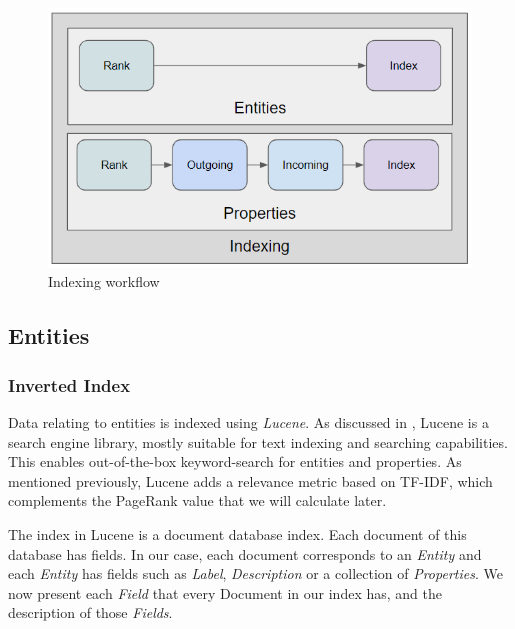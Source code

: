 \begin{figure}[H]
    \centering
        \includegraphics[width=0.7\linewidth]{imagenes/Indexing.png}
        \caption{Indexing workflow}
        \label{fig:indexing}
\end{figure}

\subsection{Entities}

\subsubsection{Inverted Index}

Data relating to entities is indexed using \textit{Lucene}. 
As discussed in , Lucene is a search engine library, mostly suitable for text indexing and searching capabilities. 
This enables out-of-the-box keyword-search for entities and properties.
As mentioned previously, Lucene adds a relevance metric based on TF-IDF, which complements the PageRank value that we will calculate later.

The index in Lucene is a document database index. 
Each document of this database has fields. 
In our case, each document corresponds to an \textit{Entity} and each \textit{Entity} has fields such as \textit{Label}, \textit{Description} or a collection of \textit{Properties}. 
We now present each \textit{Field} that every Document in our index has, and the description of those \textit{Fields}.

